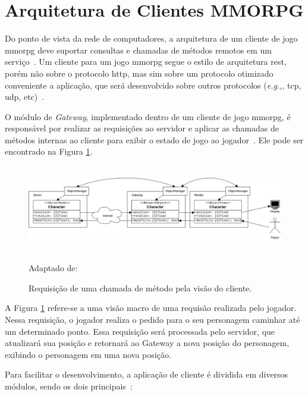 \section{Arquitetura de Clientes MMORPG}
\label{sec:cliente}



Do ponto de vista da rede de computadores, a arquitetura de um cliente de jogo \ac{mmorpg} deve suportar consultas e chamadas de métodos remotos em um serviço~\cite{albion_online_unite}.
%
Um cliente para um jogo \ac{mmorpg} segue o estilo de arquitetura \ac{rest}, porém não sobre o protocolo \ac{http}, mas sim sobre um protocolo otimizado conveniente a aplicação, que será desenvolvido sobre outros protocolos (\textit{e.g.,}, \ac{tcp}, \ac{udp}, etc)~\cite{albion_online_unite, stephenclarkewillson2017}.

O módulo de \textit{Gateway}, implementado dentro de um cliente de jogo \ac{mmorpg}, é responsável por realizar as requisições ao servidor e aplicar as chamadas de métodos internas ao cliente para exibir o estado de jogo ao jogador~\cite{albion_online_unite}.
%
Ele pode ser encontrado na Figura \ref{fig:gateway}.


\begin{figure}[htb!]
\caption{Requisição de uma chamada de método pela visão do cliente.}
\label{fig:gateway}
\includegraphics[height=3.8cm]{img/cap2/gateway.png}
\centering

Adaptado de:~\cite{albion_online_unite}
\end{figure}



A Figura \ref{fig:gateway} refere-se a uma visão macro de uma requisão realizada pelo jogador.
%
Nessa requisição, o jogador realiza o pedido para o seu personagem caminhar até um determinado ponto.
%
Essa requisição será processada pelo servidor, que atualizará sua posição e retornará ao Gateway a nova posição do personagem, exibindo o personagem em uma nova posição.



Para facilitar o desenvolvimento, a aplicação de cliente é dividida em diversos módulos, sendo os dois principais~\cite{albion_online_unite}:



